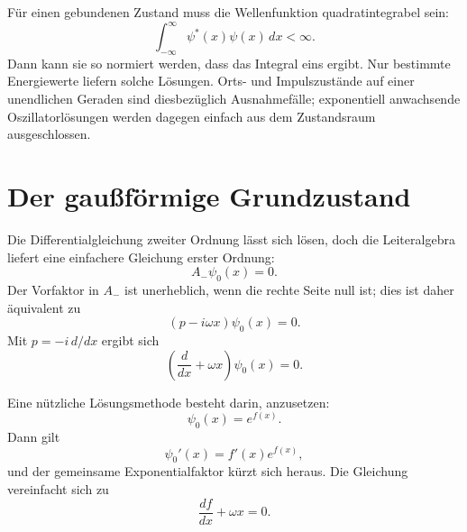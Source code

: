 Für einen gebundenen Zustand muss die Wellenfunktion quadratintegrabel sein:
\begin{equation}
\int_{-\infty}^{\infty}\psi^{*}(x)\psi(x)\,dx<\infty.
\end{equation}
Dann kann sie so normiert werden, dass das Integral eins ergibt. Nur bestimmte Energiewerte liefern solche Lösungen. Orts- und Impulszustände auf einer unendlichen Geraden sind diesbezüglich Ausnahmefälle; exponentiell anwachsende Oszillatorlösungen werden dagegen einfach aus dem Zustandsraum ausgeschlossen.

\section{Der gaußförmige Grundzustand}

Die Differentialgleichung zweiter Ordnung lässt sich lösen, doch die Leiteralgebra liefert eine einfachere Gleichung erster Ordnung:
\begin{equation}
A_{-}\psi_{0}(x)=0.
\end{equation}
Der Vorfaktor in \(A_{-}\) ist unerheblich, wenn die rechte Seite null ist; dies ist daher äquivalent zu
\begin{equation}
(p-i\omega x)\psi_{0}(x)=0.
\end{equation}
Mit \(p=-i\,d/dx\) ergibt sich
\begin{equation}
\left(\frac{d}{dx}+\omega x\right)\psi_{0}(x)=0.
\end{equation}

\begin{classroomqa}
\end{classroomqa}

Eine nützliche Lösungsmethode besteht darin, anzusetzen:
\begin{equation}
\psi_{0}(x)=e^{f(x)}.
\end{equation}
Dann gilt
\[
\psi_{0}'(x)=f'(x)e^{f(x)},
\]
und der gemeinsame Exponentialfaktor kürzt sich heraus. Die Gleichung vereinfacht sich zu
\begin{equation}
\frac{df}{dx}+\omega x=0.
\end{equation}

